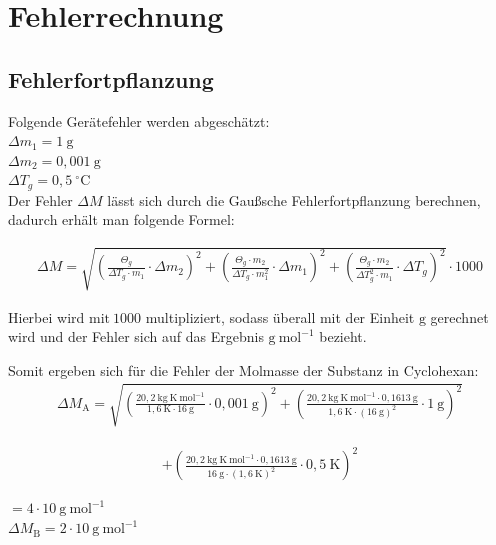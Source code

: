 \documentclass[12pt,a4paper,titlepage,headinclude,bibtotoc]{scrartcl}
\begin{document}
\section{Fehlerrechnung}
\subsection{Fehlerfortpflanzung}
Folgende Gerätefehler werden abgeschätzt:\\

$\Delta m_1 = 1{~}\mathrm{g}  $\\
$\Delta m_2 = 0,001{~}\mathrm{g}  $\\
$\Delta T_g = 0,5{~}^{\circ} \text{C}  $\\

Der Fehler $\Delta M$ lässt sich durch die Gaußsche Fehlerfortpflanzung berechnen, dadurch erhält man folgende Formel:

\begin{align}
\Delta M = \sqrt{ \left( \frac {\Theta _g}{ \Delta T_g\cdot m_1} \cdot \Delta m_2 \right)^2 + \left( \frac {\Theta _g \cdot m_2 }{ \Delta T_g\cdot m_1^2 } \cdot \Delta m_1 \right)^2 + \left( \frac {\Theta _g \cdot m_2 }{ \Delta T_g^2 \cdot m_1} \cdot \Delta T_g \right)^2 } \cdot 1000
\end{align}

Hierbei wird $\mathrm{mit {~}1000}$ multipliziert, sodass überall mit der Einheit $\mathrm{g}$ gerechnet wird und der Fehler sich auf das Ergebnis $\mathrm{g{~} mol^{-1}}$ bezieht.

Somit ergeben sich für die Fehler der Molmasse der Substanz in Cyclohexan:\\

\begin{align}
\Delta M_\mathrm{A} = \sqrt{ \left( \frac {20,2 {~}\mathrm{kg {~} K {~} mol^{-1}}}{ 1,6 {~} \mathrm{K} \cdot 16 {~}\mathrm{g}} \cdot 0,001 {~}\mathrm{g} \right)^2 + \left( \frac { 20,2 {~}\mathrm{kg{~}K {~} mol^{-1}} \cdot 0,1613{~}\mathrm{g} }{ 1,6 {~}\text{K}\cdot (16 {~}\mathrm{g} )^2 } \cdot 1 {~} \mathrm{g} \right)^2}  
\end{align}

\begin{align}
+  \left( \frac {20,2 {~}\mathrm{kg{~}K {~} mol^{-1}} \cdot 0,1613 {~} \mathrm{g}} { 16 {~} \mathrm{g} \cdot (1,6 {~} \text{K})^2} \cdot 0,5{~} \text{K} \right)^2 
\end{align}

$ = 4 \cdot 10{~}\mathrm{g{~}mol^{-1}} $\\
$\Delta M_\mathrm{B} = 2 \cdot 10 {~}\mathrm{g{~}mol^{-1}}$\\\\
\end{document}
